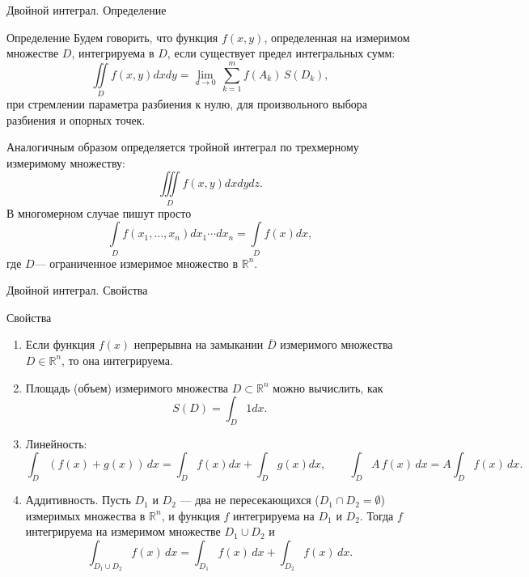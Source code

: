 \documentclass[8pt]{beamer}
\begin{document}

\begin{frame}{Двойной интеграл. Определение}
\begin{block}{Определение}
Будем говорить, что функция $f(x,y)$, определенная на измеримом множестве $D$, интегрируема в $D$, если  существует предел интегральных сумм:
$$\iint\limits_D f(x,y)dxdy = \lim_{d\to 0}\, \sum_{k=1}^m f(A_k)\, S(D_k),$$
при стремлении параметра разбиения к нулю, для произвольного выбора разбиения и опорных точек.
\end{block}
Аналогичным образом определяется тройной интеграл по трехмерному измеримому множеству:
$$\iiint\limits_D f(x,y)dxdydz.$$
В многомерном случае пишут просто
$$\int\limits_D f(x_1,\ldots,x_n)dx_1\cdots dx_n = \int\limits_D f(x) dx,$$
где $D$--- ограниченное измеримое множество в $\mathbb{R}^n$.
\end{frame}

\begin{frame}{Двойной интеграл. Свойства}
\begin{block}{Свойства}
\begin{enumerate}
\item Если функция $f(x)$ непрерывна на замыкании $\overline{D}$ измеримого множества $D\in\mathbb{R}^n$, то она интегрируема.
\item Площадь (объем) измеримого множества $D\subset\mathbb{R}^n$ можно вычислить, как
$$S(D) = \int_D 1dx.$$
\item Линейность:
$$\int_D \left( f(x)+g(x)\right) \, dx = \int_D f(x)dx+\int_D g(x)dx,\qquad \int_D A\, f(x)\,dx = A\int_D f(x)\,dx. $$
\item Аддитивность. Пусть $D_1$ и $D_2$ --- два не пересекающихся ($D_1\cap D_2 = \emptyset$) измеримых множества в $\mathbb{R}^n$, и функция $f$ интегрируема на $D_1$ и $D_2$. Тогда $f$ интегрируема на измеримом множестве $D_1\cup D_2$ и 
$$\int_{D_1\cup D_2}f(x)\,dx = \int_{D_1} f(x)\,dx+\int_{D_2}f(x)\,dx.$$
\end{enumerate}
\end{block}
\end{frame}
\end{document}
